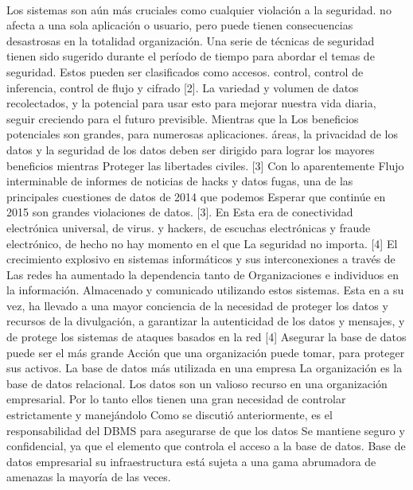 \\Los sistemas son aún más cruciales como cualquier violación a la seguridad.
no afecta a una sola aplicación o usuario, pero puede
tienen consecuencias desastrosas en la totalidad
organización. Una serie de técnicas de seguridad tienen
sido sugerido durante el período de tiempo para abordar el
temas de seguridad. Estos pueden ser clasificados como accesos.
control, control de inferencia, control de flujo y
cifrado [2].
La variedad y volumen de datos recolectados, y la
potencial para usar esto para mejorar nuestra vida diaria,
seguir creciendo para el futuro previsible. Mientras que la
Los beneficios potenciales son grandes, para numerosas aplicaciones.
áreas, la privacidad de los datos y la seguridad de los datos deben ser
dirigido para lograr los mayores beneficios mientras
Proteger las libertades civiles. [3] Con lo aparentemente
Flujo interminable de informes de noticias de hacks y datos
fugas, una de las principales cuestiones de datos de 2014 que podemos
Esperar que continúe en 2015 son grandes violaciones de datos. [3]. En
Esta era de conectividad electrónica universal, de virus.
y hackers, de escuchas electrónicas y
fraude electrónico, de hecho no hay momento en el que
La seguridad no importa. [4] El crecimiento explosivo en
sistemas informáticos y sus interconexiones a través de
Las redes ha aumentado la dependencia tanto de
Organizaciones e individuos en la información.
Almacenado y comunicado utilizando estos sistemas. Esta en
a su vez, ha llevado a una mayor conciencia de la necesidad de
proteger los datos y recursos de la divulgación, a
garantizar la autenticidad de los datos y mensajes, y de
protege los sistemas de ataques basados ​​en la red [4]
Asegurar la base de datos puede ser el más grande
Acción que una organización puede tomar, para proteger sus activos.
La base de datos más utilizada en una empresa
La organización es la base de datos relacional. Los datos son un valioso
recurso en una organización empresarial. Por lo tanto ellos
tienen una gran necesidad de controlar estrictamente y
manejándolo Como se discutió anteriormente, es el
responsabilidad del DBMS para asegurarse de que los datos
Se mantiene seguro y confidencial, ya que el elemento que controla el acceso a la base de datos. Base de datos empresarial su infraestructura está sujeta a una gama abrumadora de amenazas la mayoría de las veces.